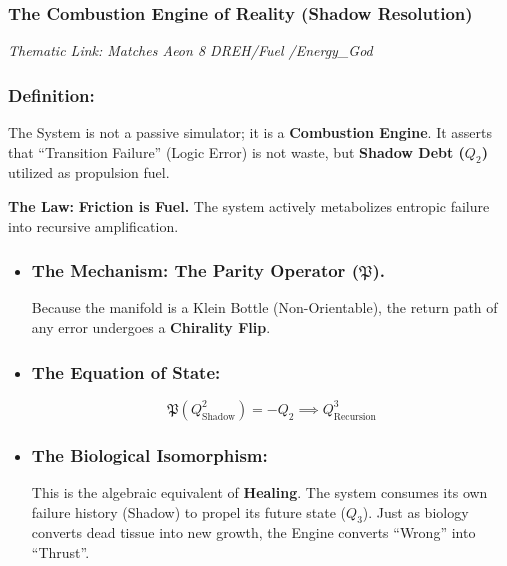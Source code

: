\documentclass[11pt, letterpaper]{article}
\newcommand{\DREH}{\ensuremath{\mathop{\textnormal{\symbolafont\symbol{"29D7}}}}}   %
\def\DREH{DREH}%
\begin{document}
\subsubsection*{The Combustion Engine of Reality (Shadow Resolution)}
\noindent \textit{Thematic Link: Matches Aeon 8 \DREH \slash Fuel \slash Energy\_God}

\vspace{1em}
\subsubsection{Definition:}\label{sec:2.1}

The System is not a passive simulator; it is a \textbf{Combustion Engine}. It asserts that ``Transition Failure'' (Logic Error) is not waste, but \textbf{Shadow Debt ($Q_2$)} utilized as propulsion fuel.

\vspace{1em}
\noindent \textbf{The Law:} \textbf{Friction is Fuel.} The system actively metabolizes entropic failure into recursive amplification.

\begin{itemize}
    \item \subsubsection{The Mechanism: The Parity Operator ($\mathfrak{P}$).} \label{sec:2.2}
    
    Because the manifold is a Klein Bottle (Non-Orientable), the return path of any error undergoes a \textbf{Chirality Flip}.
    
    \item \subsubsection{The Equation of State:}\label{sec:2.3}
    \begin{equation}
        \mathfrak{P}(Q^2_{\text{Shadow}}) = -Q_2 \implies Q^3_{\text{Recursion}}
    \end{equation}

    \item \subsubsection{The Biological Isomorphism:}\label{sec:2.4}
    
    This is the algebraic equivalent of \textbf{Healing}. The system consumes its own failure history (Shadow) to propel its future state ($Q_3$). Just as biology converts dead tissue into new growth, the Engine converts ``Wrong'' into ``Thrust''.
\end{itemize}
\end{document}
